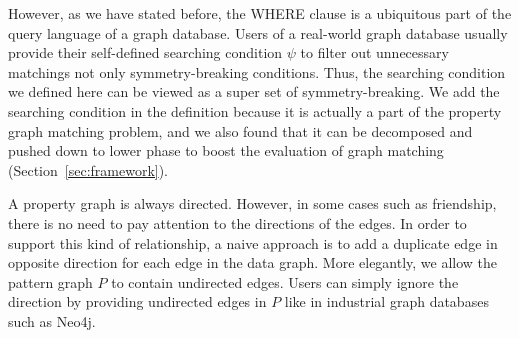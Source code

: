 However, as we have stated before, the WHERE clause is a ubiquitous part of the query language of a graph database.
Users of a real-world graph database usually provide their self-defined searching condition $\psi$ to filter out unnecessary matchings not only symmetry-breaking conditions.
Thus, the searching condition we defined here can be viewed as a super set of symmetry-breaking.
We add the searching condition in the definition because it is actually a part of the property graph matching problem,
and we also found that it can be decomposed and pushed down to lower phase to boost the evaluation of graph matching (Section~\ref{sec:framework}).

A property graph is always directed.
However, in some cases such as friendship, there is no need to pay attention to the directions of the edges.
In order to support this kind of relationship, a naive approach is to add a duplicate edge in opposite direction for each edge in the data graph.
More elegantly, we allow the pattern graph $P$ to contain undirected edges.
Users can simply ignore the direction by providing undirected edges in $P$ like in industrial graph databases such as Neo4j.
